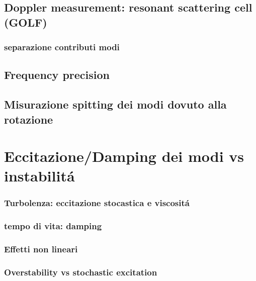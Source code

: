 \documentclass[../main.tex]{subfiles}
\begin{document}
\section{Doppler measurement: resonant scattering cell (GOLF)}

\subsection{separazione contributi modi}

\section{Frequency precision}

\section{Misurazione spitting dei modi dovuto alla rotazione}

\chapter{Eccitazione/Damping dei modi vs instabilit\'a}

\subsection{Turbolenza: eccitazione stocastica e viscosit\'a}

\subsection{tempo di vita: damping}

\subsection{Effetti non lineari}

\subsection{Overstability vs stochastic excitation}
\end{document}
